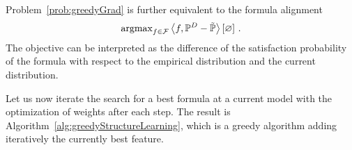 Problem~\eqref{prob:greedyGrad} is further equivalent to the formula alignment
\begin{align*}
    \mathrm{argmax}_{f\in\mathcal{F}} \left\langle f,\mathbb{P}^{D}-\tilde{\mathbb{P}}\right\rangle \left[ \varnothing \right] \, .
\end{align*}
The objective can be interpreted as the difference of the satisfaction probability of the formula with respect to the empirical distribution and the current distribution.













Let us now iterate the search for a best formula at a current model with the optimization of weights after each step.
The result is Algorithm~\ref{alg:greedyStructureLearning}, which is a greedy algorithm adding iteratively the currently best feature.

